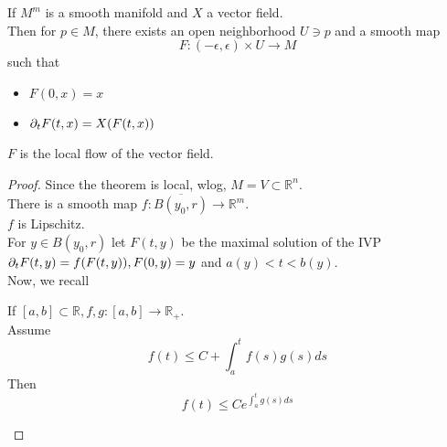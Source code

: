 \documentclass[../main.tex]{subfiles}
\begin{document}
\begin{thm}
	If $M^{m}$ is a smooth manifold and $X$ a vector field.\\
	Then for $p \in M$, there exists an open neighborhood $U \ni p$ and a smooth map
	\[ 
	F: ( -\epsilon,\epsilon) \times U \to M
	\]
	such that
	\begin{itemize}
	\item $F( 0,x) =x$ 
	\item $\partial_tF( t,x) = X( F( t,x) )$
	\end{itemize}
$F$ is the local flow of the vector field.	
\end{thm}
\begin{proof}
Since the theorem is local, wlog, $M= V \subset \mathbb{R}^n$.\\
There is a smooth map $f: \overline{B( y_0, r) }\to \mathbb{R}^{m}$.\\
$f$ is Lipschitz.\\
For $y \in B( y_0, r) $ let $F( t,y) $ be the maximal solution of the IVP $\partial_t F( t,y) = f(F( t,y) ), F( 0,y) = y$ and $a( y) < t < b( y) $.\\
Now, we recall
\begin{lemma}
	If $[a,b] \subset \mathbb{R}, f,g:[a,b] \to \mathbb{R}_+$.\\
	Assume
	\[ 
	f( t) \leq C + \int_{ a }^{ t } f( s) g( s) ds
	\]
	Then 
	\[ 
	f( t) \leq  C e^{ \int_{ a }^{ t }g( s) ds} 
	\]
	

\end{lemma}
\end{proof}
\end{document}
